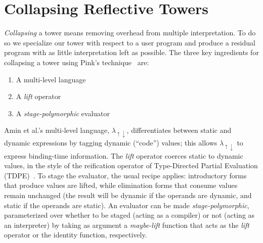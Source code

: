 \documentclass[sigplan,anonymous,review]{acmart}
\newcommand{\mslang}{$\lambda_{\uparrow\downarrow}$}
\theoremstyle{definition}
\begin{document}
\section{Collapsing Reflective Towers}\label{subsec:collapse}

\textit{Collapsing} a tower means removing overhead from multiple interpretation. To do so we specialize our tower with respect to a user program and produce a residual program with as little interpretation left as possible. The three key ingredients for collapsing a tower using Pink's technique~\cite{amin2017collapsing} are:
\begin{enumerate}
    \item A multi-level language
    \item A \textit{lift} operator
    \item A \textit{stage-polymorphic} evaluator
\end{enumerate}
Amin et al.'s multi-level language, \mslang, differentiates between
static and dynamic expressions by tagging dynamic (``code'') values;
this allows \mslang{} to express binding-time information. The
\textit{lift} operator coerces static to dynamic values, in the style
of the reification operator of Type-Directed Partial Evaluation (TDPE)~\cite{danvy1999type}.
To stage the evaluator, the usual recipe applies: introductory forms that
produce values are lifted, while elimination forms that consume values
remain unchanged (the result will be dynamic if the operands are
dynamic, and static if the operands are static). An evaluator can be
made \textit{stage-polymorphic}, parameterized over whether to be
staged (acting as a compiler) or not (acting as an interpreter) by
taking as argument a \textit{maybe-lift} function that acts as the
\textit{lift} operator or the identity function, respectively.
\end{document}

